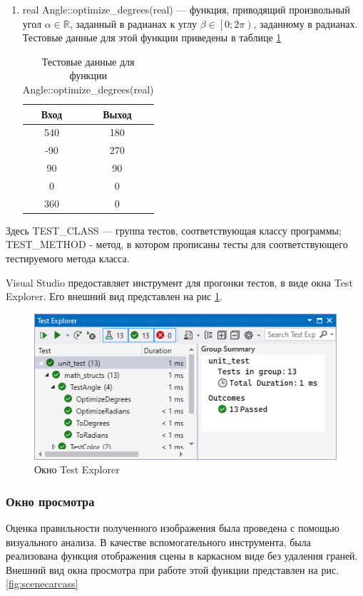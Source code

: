 \begin{enumerate}
	\item real Angle::optimize\_degrees(real) --- функция, приводящий произвольный угол $\alpha\in\mathbb{R}$, заданный в радианах к углу $\beta\in\left[0; 2\pi\right)$, заданному в радианах. Тестовые данные для этой функции приведены в таблице \ref{tbl:optimize_degrees}
	\begin{table}
		\centering
		\caption{Тестовые данные для функции Angle::optimize\_degrees(real)}
		\label{tbl:optimize_degrees}
		\begin{tabular}{|c|c|}
			\hline
			Вход & Выход \\
			\hline
			540 & 180 \\
			-90 & 270 \\
			90 & 90 \\
			0 & 0 \\
			360 & 0 \\
			\hline
		\end{tabular}
	\end{table}
\end{enumerate}

Здесь TEST\_CLASS --- группа тестов, соответствующая классу программы; TEST\_METHOD - метод, в котором прописаны тесты для соответствующего тестируемого метода класса.

Visual Studio предоставляет инструмент для прогонки тестов, в виде окна Test Explorer. Его внешний вид представлен на рис \ref{fig:test_explorer}.

\begin{figure}[ht]
	\centering
	\includegraphics[width=1\linewidth]{img/test_explorer}
	\caption{Окно Test Explorer}
	\label{fig:test_explorer}
\end{figure}


\subsubsection{Окно просмотра}
Оценка правильности полученного изображения была проведена с помощью визуального анализа. В качестве вспомогательного инструмента, была реализована функция отображения сцены в каркасном виде без удаления граней. Внешний вид окна просмотра при работе этой функции представлен на рис. \ref{fig:scenecarcass}

